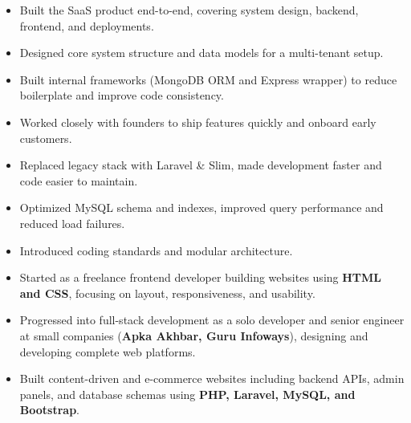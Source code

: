 \documentclass[10pt,a4paper,ragged2e,withhyper]{altacv}
\begin{document}
\begin{itemize}
\item Built the SaaS product end-to-end, covering system design, backend, frontend, and deployments.
\item Designed core system structure and data models for a multi-tenant setup.
\item Built internal frameworks (MongoDB ORM and Express wrapper) to reduce boilerplate and improve code consistency.
\item Worked closely with founders to ship features quickly and onboard early customers.
\end{itemize}

{\small{}    }

\bigskip

\begin{itemize}
\item Replaced legacy stack with Laravel \& Slim, made development faster and code easier to maintain.
\item Optimized MySQL schema and indexes, improved query performance and reduced load failures.
\item Introduced coding standards and modular architecture.
\end{itemize}
{\small{}     }

\bigskip


\begin{itemize}
\item Started as a freelance frontend developer building websites using
\textbf{HTML and CSS}, focusing on layout, responsiveness, and usability.
\item Progressed into full-stack development as a solo developer and senior
engineer at small companies (\textbf{Apka Akhbar, Guru Infoways}),
designing and developing complete web platforms.
\item Built content-driven and e-commerce websites including backend APIs,
admin panels, and database schemas using
\textbf{PHP, Laravel, MySQL, and Bootstrap}.
\end{itemize}

\pagebreak
\end{document}

